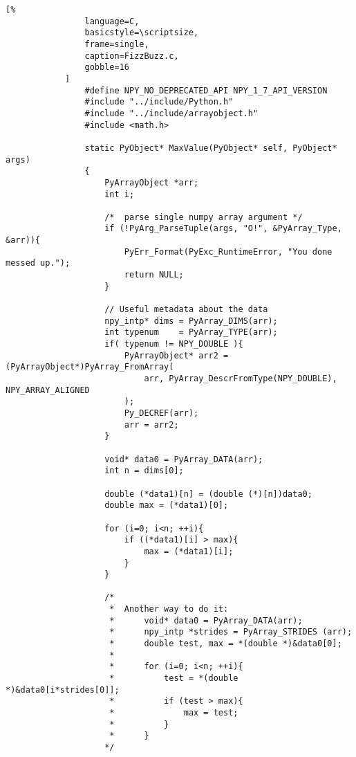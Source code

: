 \documentclass[crop=false,class=book,oneside]{standalone}
\begin{document}
            \begin{lstlisting}[%
                language=C,
                basicstyle=\scriptsize,
                frame=single,
                caption=FizzBuzz.c,
                gobble=16
            ]
                #define NPY_NO_DEPRECATED_API NPY_1_7_API_VERSION
                #include "../include/Python.h"
                #include "../include/arrayobject.h"
                #include <math.h>

                static PyObject* MaxValue(PyObject* self, PyObject* args)
                {
                    PyArrayObject *arr;
                    int i;
                
                    /*  parse single numpy array argument */
                    if (!PyArg_ParseTuple(args, "O!", &PyArray_Type, &arr)){
                        PyErr_Format(PyExc_RuntimeError, "You done messed up.");
                        return NULL;
                    }
                
                    // Useful metadata about the data
                    npy_intp* dims = PyArray_DIMS(arr);
                    int typenum    = PyArray_TYPE(arr);
                    if( typenum != NPY_DOUBLE ){
                        PyArrayObject* arr2 = (PyArrayObject*)PyArray_FromArray(
                            arr, PyArray_DescrFromType(NPY_DOUBLE), NPY_ARRAY_ALIGNED
                        );
                        Py_DECREF(arr);
                        arr = arr2;
                    }
                
                    void* data0 = PyArray_DATA(arr);
                    int n = dims[0];
                
                    double (*data1)[n] = (double (*)[n])data0;
                    double max = (*data1)[0];
                
                    for (i=0; i<n; ++i){
                        if ((*data1)[i] > max){
                            max = (*data1)[i];
                        }
                    }
                
                    /*
                     *  Another way to do it:
                     *      void* data0 = PyArray_DATA(arr);
                     *      npy_intp *strides = PyArray_STRIDES (arr);
                     *      double test, max = *(double *)&data0[0];
                     *
                     *      for (i=0; i<n; ++i){
                     *          test = *(double *)&data0[i*strides[0]];
                     *          if (test > max){
                     *              max = test;
                     *          }
                     *      }
                    */
                

\end{lstlisting}
\end{document}

